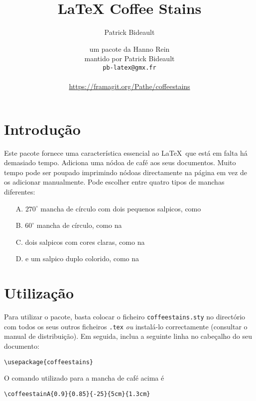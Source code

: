 \documentclass[a4paper, 11pt, BCOR = 0 pt, oneside]{scrartcl}
\author{Patrick Bideault}
\begin{document}
\title{LaTeX Coffee Stains}
\author{um pacote da Hanno Rein\\
mantido por Patrick Bideault\\
  \texttt{pb-latex@gmx.fr}\\
  ~\\
  \url{https://framagit.org/Pathe/coffeestains}}
\renewcommand{\today}{versão \gitRel{} -- \DTMtoday{}}
\maketitle

\label{stainA}
\section{Introdução}
Este pacote fornece uma característica essencial ao \LaTeX~que está em falta há
demasiado tempo. Adiciona uma nódoa de café aos seus documentos. Muito tempo
pode ser poupado imprimindo nódoas directamente na página em vez de os adicionar manualmente. Pode escolher entre quatro tipos de manchas diferentes:
\begin{itemize}
\item[A.] $270^\circ$ mancha de círculo com dois pequenos salpicos, como 
  \item[B.] $60^\circ$ mancha de círculo, como na 
  \item[C.] dois salpicos com cores claras, como na 
  \item[D.] e um salpico duplo colorido, como na 
\end{itemize}

\section{Utilização}
Para utilizar o pacote, basta colocar o ficheiro \texttt{coffeestains.sty} no directório com todos os seus outros ficheiros \texttt{.tex} \textit{ou} instalá-lo correctamente (consultar o manual de distribuição). Em seguida, inclua a seguinte linha no cabeçalho do seu documento:
\begin{verbatim}
\usepackage{coffeestains}
\end{verbatim}

\vfill{}

\begin{tcolorbox}
O comando utilizado para a mancha de café acima é

  \verb|\coffeestainA{0.9}{0.85}{-25}{5cm}{1.3cm}|
\end{tcolorbox}
\newpage{}
\label{stainB}
\end{document}
